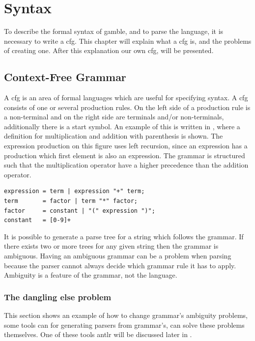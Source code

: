 \chapter{Syntax}\label{chap:syntax}

To describe the formal syntax of \gls{gamble}, and to parse the language, it is necessary to write a \acrfull{cfg}.
This chapter will explain what a \acrshort{cfg} is, and the problems of creating one.
After this explanation our own \acrshort{cfg}, will be presented.

\section{Context-Free Grammar}\label{sec:cfg}
A \acrshort{cfg} is an area of formal languages which are useful for specifying syntax. 
A \acrshort{cfg} consists of one or several production rules.
On the left side of a production rule is a non-terminal and on the right side are terminals and/or non-terminals, additionally there is a start symbol.
An example of this is written in , where a definition for multiplication and addition with parenthesis is shown.
The expression production on this figure uses left recursion, since an expression has a production which first element is also an expression.
The grammar is structured such that the multiplication operator have a higher precedence than the addition operator.

\begin{lstlisting}[caption={An example of a \acrshort{cfg} written in \acrshort{ebnf}, with \acrshort{regex} for defining numbers. },frame=tlrb,label={lst:cfglst1},numbers=none]
expression = term | expression "+" term;
term       = factor | term "*" factor;
factor     = constant | "(" expression ")";
constant   = [0-9]+
\end{lstlisting}

It is possible to generate a parse tree for a string which follows the grammar. 
If there exists two or more trees for any given string then the grammar is ambiguous. 
Having an ambiguous grammar can be a problem when parsing because the parser cannot always decide which grammar rule it has to apply.
Ambiguity is a feature of the grammar, not the language. 

\subsection{The dangling else problem}
This section shows an example of how to change grammar's ambiguity problems, some tools can for generating parsers from grammar's, can solve these problems themselves.
One of these tools \acrshort{antlr} will be discussed later in .


